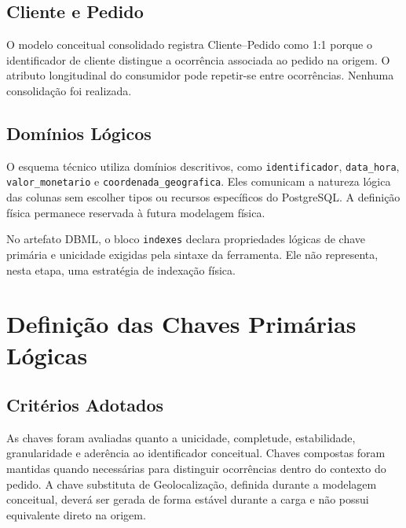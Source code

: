 \documentclass[12pt,a4paper]{article}
\begin{document}
	\subsection{Cliente e Pedido}
	O modelo conceitual consolidado registra Cliente--Pedido como 1:1 porque o
	identificador de cliente distingue a ocorrência associada ao pedido na origem. O
	atributo longitudinal do consumidor pode repetir-se entre ocorrências. Nenhuma consolidação foi realizada.

	\subsection{Domínios Lógicos}
	O esquema técnico utiliza domínios descritivos, como \texttt{identificador},
	\texttt{data\_hora}, \texttt{valor\_monetario} e
	\texttt{coordenada\_geografica}. Eles comunicam a natureza lógica das colunas
	sem escolher tipos ou recursos específicos do PostgreSQL. A definição física
	permanece reservada à futura modelagem física.

	No artefato DBML, o bloco \texttt{indexes} declara propriedades lógicas de
	chave primária e unicidade exigidas pela sintaxe da ferramenta. Ele não
	representa, nesta etapa, uma estratégia de indexação física.

	\section{Definição das Chaves Primárias Lógicas}

	\subsection{Critérios Adotados}

	As chaves foram avaliadas quanto a unicidade, completude, estabilidade,
	granularidade e aderência ao identificador conceitual. Chaves compostas foram
	mantidas quando necessárias para distinguir ocorrências dentro do contexto do
	pedido. A chave substituta de Geolocalização, definida durante a modelagem conceitual, deverá ser
	gerada de forma estável durante a carga e não possui equivalente direto na
	origem.
\end{document}
